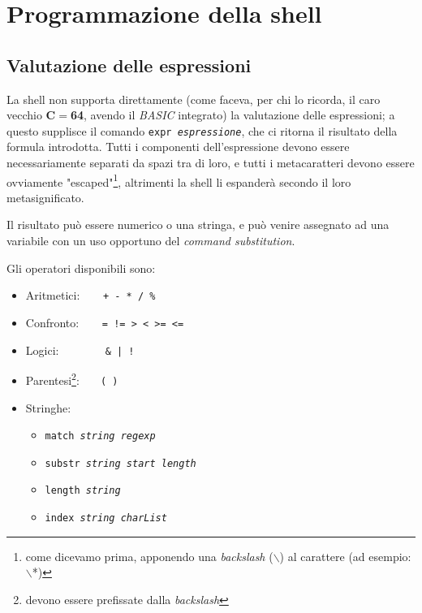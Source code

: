\chapter{Programmazione della shell}

\section{Valutazione delle espressioni}
La shell non supporta direttamente (come faceva, per chi lo ricorda, il caro vecchio
\textbf{C$=$64}, avendo il \emph{BASIC} integrato) la valutazione delle
espressioni; a questo supplisce il comando \texttt{expr \textit{espressione}},
che ci ritorna il risultato della formula introdotta. Tutti i componenti
dell'espressione devono essere necessariamente separati da spazi tra di loro,
e tutti i metacaratteri devono essere ovviamente "escaped"\footnote{come
dicevamo prima, apponendo una \textit{backslash} ($\backslash$) al carattere
(ad esempio: $\backslash$*)}, altrimenti la shell li espander\`a secondo il
loro metasignificato.

Il risultato pu\`o essere numerico o una stringa, e pu\`o venire assegnato ad
una variabile con un uso opportuno del \emph{command substitution}.

Gli operatori disponibili sono:
\begin{itemize}
	\item Aritmetici:\texttt{\ \ \ \ + - * / \%}
	\item Confronto:\texttt{\ \ \ \ = != > < >= <=}
	\item Logici:\texttt{\ \ \ \ \ \ \ \ \& | !}
	\item Parentesi\footnote{devono essere prefissate dalla
	\emph{backslash}}: \texttt{\ \ \ ( )}
	\item Stringhe:
	\begin{itemize}
		\item \texttt{match \textit{string regexp}}
		\item \texttt{substr \textit{string start length}}
		\item \texttt{length \textit{string}}
		\item \texttt{index \textit{string charList}}
	\end{itemize}
\end{itemize}

